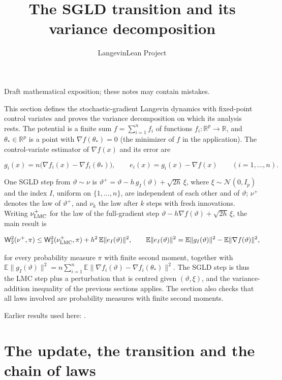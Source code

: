 \documentclass[11pt,a4paper]{article}
\title{\texorpdfstring{The SGLD transition and its variance decomposition}{The SGLD transition and its variance decomposition}}
\author{LangevinLean Project}
\date{}
\begin{document}
\maketitle
Draft mathematical exposition; these notes may contain mistakes.


This section defines the stochastic-gradient Langevin dynamics with fixed-point control variates and proves the variance decomposition on which its analysis rests. The potential is a finite sum \(f=\sum_{i=1}^nf_i\) of functions \(f_i:\mathbb R^p\to\mathbb R\), and \(\theta_*\in\mathbb R^p\) is a point with \(\nabla f(\theta_*)=0\) (the minimizer of \(f\) in the application). The control-variate estimator of \(\nabla f(x)\) and its error are


\[g_i(x)=n\bigl(\nabla f_i(x)-\nabla f_i(\theta_*)\bigr),\qquad e_i(x)=g_i(x)-\nabla f(x)\qquad(i=1,\dots,n).\]


One SGLD step from \(\vartheta\sim\nu\) is \(\vartheta^+=\vartheta-h\,g_I(\vartheta)+\sqrt{2h}\,\xi\), where \(\xi\sim\mathcal N(0,I_p)\) and the index \(I\), uniform on \(\{1,\dots,n\}\), are independent of each other and of \(\vartheta\); \(\nu^+\) denotes the law of \(\vartheta^+\), and \(\nu_k\) the law after \(k\) steps with fresh innovations. Writing \(\nu^+_{\rm LMC}\) for the law of the full-gradient step \(\vartheta-h\nabla f(\vartheta)+\sqrt{2h}\,\xi\), the main result is


\[\mathsf W_2^2(\nu^+,\pi)\le\mathsf W_2^2(\nu^+_{\rm LMC},\pi)+h^2\,\mathbb E\|e_I(\vartheta)\|^2,\qquad\mathbb E\|e_I(\vartheta)\|^2=\mathbb E\|g_I(\vartheta)\|^2-\mathbb E\|\nabla f(\vartheta)\|^2,\]


for every probability measure \(\pi\) with finite second moment, together with \(\mathbb E\|g_I(\vartheta)\|^2=n\sum_{i=1}^n\mathbb E\|\nabla f_i(\vartheta)-\nabla f_i(\theta_*)\|^2\). The SGLD step is thus the LMC step plus a perturbation that is centred given \((\vartheta,\xi)\), and the variance-addition inequality of the previous sections applies. The section also checks that all laws involved are probability measures with finite second moments.



Earlier results used here: \cite[Section~3.10]{LangevinLean2026ULALSI}.

\section{\texorpdfstring{The update, the transition and the chain of laws}{The update, the transition and the chain of laws}}
\end{document}
